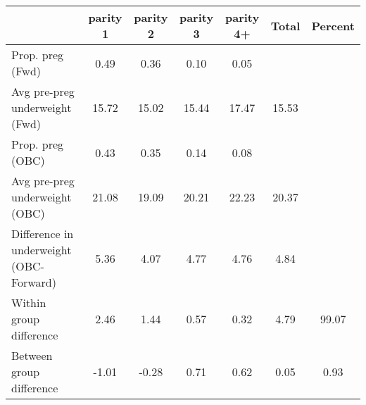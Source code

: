 \begin{tabular}{l*{6}{c}}
\toprule
            &\multicolumn{1}{c}{parity 1}&\multicolumn{1}{c}{parity 2}&\multicolumn{1}{c}{parity 3}&\multicolumn{1}{c}{parity 4+}&\multicolumn{1}{c}{Total}&\multicolumn{1}{c}{Percent}\\
\midrule
\midrule
Prop. preg (Fwd)&        0.49&        0.36&        0.10&        0.05&            &            \\
Avg pre-preg underweight (Fwd)&       15.72&       15.02&       15.44&       17.47&       15.53&            \\
Prop. preg (OBC)&        0.43&        0.35&        0.14&        0.08&            &            \\
Avg pre-preg underweight (OBC)&       21.08&       19.09&       20.21&       22.23&       20.37&            \\
Difference in underweight (OBC-Forward)&        5.36&        4.07&        4.77&        4.76&        4.84&            \\
Within group difference&        2.46&        1.44&        0.57&        0.32&        4.79&       99.07\\
Between group difference&       -1.01&       -0.28&        0.71&        0.62&        0.05&        0.93\\
\bottomrule
\end{tabular}
